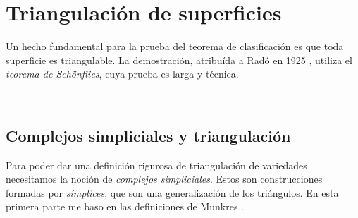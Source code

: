\documentclass[10pt]{report}
\theoremstyle{definition}
\begin{document}


\chapter{Triangulación de superficies}

Un hecho fundamental para la prueba del teorema de clasificación es que toda superficie es triangulable. La demostración, atribuída a Radó en 1925 \cite{rado}, utiliza el \emph{teorema de Schönflies}, cuya prueba es larga y técnica. 
\

\section{Complejos simpliciales y triangulación}\label{sec:simplices}

Para poder dar una definición rigurosa de triangulación de variedades necesitamos la noción de \textit{complejos simpliciales}. Estos son construcciones formadas por \textit{símplices}, que son una generalización de los triángulos. En esta primera parte me baso en las definiciones de Munkres \cite{munkres}.
\end{document}
